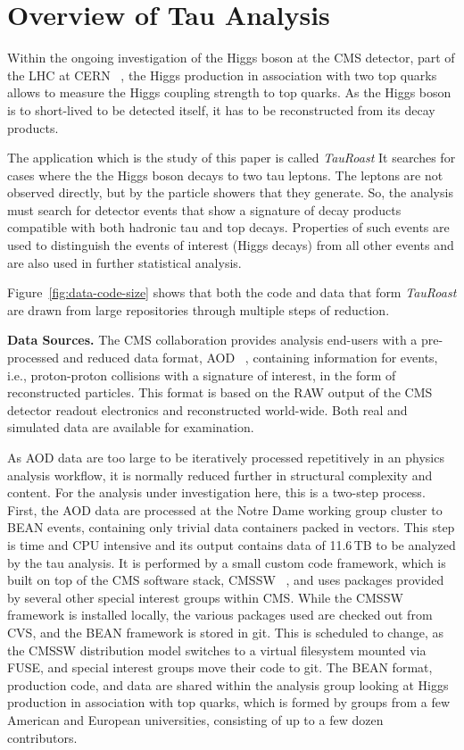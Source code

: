 \documentclass{acm_proc_article-sp}
\begin{document}
\section{Overview of Tau Analysis}

Within the ongoing investigation of the Higgs boson at the CMS
detector, part of the LHC at CERN ~\cite{collaboration2008cms}, the Higgs production in association
with two top quarks allows to measure the Higgs coupling strength to
top quarks.  As the Higgs boson is to short-lived to be detected
itself, it has to be reconstructed from its decay products.

The application which is the study of this paper is called \emph{TauRoast}
It searches for cases where the the Higgs boson decays to two tau leptons.
The leptons are not observed directly, but by the particle showers
that they generate.  So, the analysis must search for detector
events that show a signature of decay products compatible with both hadronic tau and top decays.  Properties of such events are used to distinguish
the events of interest (Higgs decays) from all other events and
are also used in further statistical analysis.

Figure~\ref{fig:data-code-size} shows that both the code and data
that form \emph{TauRoast} are drawn from large repositories through
multiple steps of reduction.

{\bf Data Sources.}
The CMS collaboration provides analysis end-users with a pre-processed
and reduced data format, AOD ~\cite{holtman2001cms}, containing information for events, i.e.,
proton-proton collisions with a signature of interest, in the form of
reconstructed particles.  This format is based on the RAW output of
the CMS detector readout electronics and reconstructed world-wide.
Both real and simulated data are available for examination.

As AOD data are too large to be iteratively processed repetitively in
an physics analysis workflow, it is normally reduced further in
structural complexity and content.  For the analysis under
investigation here, this is a two-step process.  First, the AOD data
are processed at the Notre Dame working group cluster to BEAN events,
containing only trivial data containers packed in vectors.  This step
is time and CPU intensive and its output contains data of 11.6$\,$TB to be
analyzed by the tau analysis.
It is performed by a small custom code framework,
which is built on top of the CMS software stack, CMSSW ~\cite{cms2006cmssw},
and uses packages provided by several other special interest groups within CMS.
While the CMSSW framework is installed locally,
the various packages used are checked out from CVS,
and the BEAN framework is stored in git.
This is scheduled to change,
as the CMSSW distribution model switches to a virtual filesystem mounted via FUSE,
and special interest groups move their code to git.
The BEAN format, production code, and
data are shared within the analysis group looking at Higgs production
in association with top quarks, which is formed by groups from a few
American and European universities,
consisting of up to a few dozen contributors.
\end{document}
